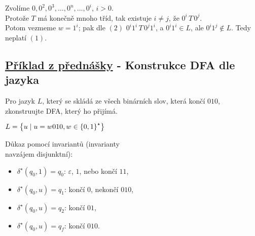 Zvolíme $0, 0^2, 0^3, \dots, 0^n, \dots, 0^i$, $i > 0$. \\ 
Protože $T$ má konečně mnoho tříd, tak existuje $i \neq j$, že $0^i \, T \, 0^j$. \\
Potom vezmeme $w = 1^i$; pak dle $(2)$ $0^i 1^i \, T \, 0^j 1^i$, a $0^i 1^i \in L$, ale $0^i 1^j \notin L$. 
Tedy neplatí $(1)$. 

\subsection{\href{https://youtu.be/agNAMdc8zYY?list=PLQL6z4JeTTQkLuzI78OTnfYBclE1g0UjS&t=4106}{Příklad z přednášky} 
- Konstrukce DFA dle jazyka} 
Pro jazyk $L$, který se skládá ze všech binárních slov, která končí $010$, zkonstruujte DFA, který ho přijímá.

\begin{minipage}{0.58\textwidth}
    $L = \left\lbrace u \mid u = w010, w \in \left\lbrace 0,1 \right\rbrace^{\star} \right\rbrace$

    
\end{minipage}\begin{minipage}{0.42\textwidth}
    Důkaz pomocí invariantů (invarianty \\navzájem disjunktní):

    \begin{itemize}[noitemsep]
        \item $\delta^\star (q_0, 1) = q_0$: $\varepsilon$, $1$, nebo končí $11$, 
        \item $\delta^\star (q_0, u) = q_1$: končí $0$, nekončí $010$, 
        \item $\delta^\star (q_0, u) = q_2$: končí $01$, 
        \item $\delta^\star (q_0, u) = q_f$: končí $010$. 
    \end{itemize}    

\end{minipage}
    
